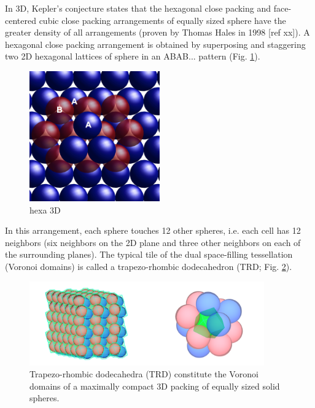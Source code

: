 In 3D, Kepler's conjecture states that the hexagonal close packing and face-centered cubic close packing arrangements of equally sized sphere have the greater density of all arrangements (proven by Thomas Hales in 1998 [ref xx]). A hexagonal close packing arrangement is obtained by superposing and staggering two 2D hexagonal lattices of sphere in an ABAB... pattern (Fig. \ref{spatial_neighb_hexagonal_compact3D}).
\begin{figure}
\begin{center}
\includegraphics[width=0.5\textwidth]{../../images/MECAGEN/spatial_neighb/hexagonal_compact3D.png}
\end{center}
\caption{hexa 3D}
\label{spatial_neighb_hexagonal_compact3D}
\end{figure}

In this arrangement, each sphere touches 12 other spheres, i.e. each cell has 12 neighbors (six neighbors on the 2D plane and three other neighbors on each of the surrounding planes). The typical tile of the dual space-filling tessellation (Voronoi domains) is called a trapezo-rhombic dodecahedron (TRD; Fig. \ref{potential_trapezo_all_figure}).
\begin{figure}
\begin{center}
\includegraphics[width=0.9\textwidth]{../../images/MECAGEN/potential/trapezo_all_figure.png}
\end{center}
\caption{Trapezo-rhombic dodecahedra (TRD) constitute the Voronoi domains of a maximally compact 3D packing of equally sized solid spheres.}
\label{potential_trapezo_all_figure}
\end{figure}

